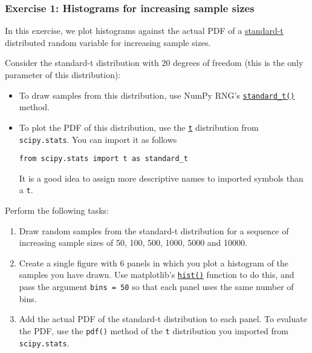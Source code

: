 \documentclass{scrartcl}
\providecommand{\tightlist}{%
      \setlength{\itemsep}{0pt}\setlength{\parskip}{0pt}}
\begin{document}
    \hypertarget{exercise-1-histograms-for-increasing-sample-sizes}{%
\subsubsection{Exercise 1: Histograms for increasing sample
sizes}\label{exercise-1-histograms-for-increasing-sample-sizes}}

In this exercise, we plot histograms against the actual PDF of a
\href{https://en.wikipedia.org/wiki/Student\%27s_t-distribution}{standard-t}
distributed random variable for increasing sample sizes.

Consider the standard-t distribution with 20 degrees of freedom (this is
the only parameter of this distribution):

\begin{itemize}
\item
  To draw samples from this distribution, use NumPy RNG's
  \href{https://numpy.org/doc/stable/reference/random/generated/numpy.random.Generator.standard_t.html}{\texttt{standard\_t()}}
  method.
\item
  To plot the PDF of this distribution, use the
  \href{https://docs.scipy.org/doc/scipy/reference/generated/scipy.stats.t.html}{\texttt{t}}
  distribution from \texttt{scipy.stats}. You can import it as follows

\begin{verbatim}
from scipy.stats import t as standard_t
\end{verbatim}

  It is a good idea to assign more descriptive names to imported symbols
  than a \texttt{t}.
\end{itemize}

Perform the following tasks:

\begin{enumerate}
\def\labelenumi{\arabic{enumi}.}
\tightlist
\item
  Draw random samples from the standard-t distribution for a sequence of
  increasing sample sizes of 50, 100, 500, 1000, 5000 and 10000.
\item
  Create a single figure with 6 panels in which you plot a histogram of
  the samples you have drawn. Use matplotlib's
  \href{https://matplotlib.org/api/_as_gen/matplotlib.pyplot.hist.html}{\texttt{hist()}}
  function to do this, and pass the argument \texttt{bins\ =\ 50} so
  that each panel uses the same number of bins.
\item
  Add the actual PDF of the standard-t distribution to each panel. To
  evaluate the PDF, use the \texttt{pdf()} method of the \texttt{t}
  distribution you imported from \texttt{scipy.stats}.
\end{enumerate}
\end{document}
